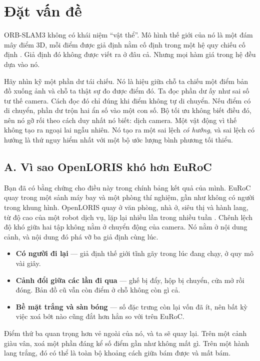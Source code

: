 \documentclass[../../deep_learning.tex]{subfiles}
\begin{document}
\section{Đặt vấn đề}
ORB-SLAM3 không có khái niệm ``vật thể''. Mô hình thế giới của nó là một đám mây điểm 3D, mỗi điểm được giả định nằm cố định trong một hệ quy chiếu cố định \cite{campos2021orbslam3}. Giả định đó không được viết ra ở đâu cả. Nhưng mọi hàm giá trong hệ đều dựa vào nó.

Hãy nhìn kỹ một phần dư tái chiếu. Nó là hiệu giữa chỗ ta chiếu một điểm bản đồ xuống ảnh và chỗ ta thật sự đo được điểm đó. Ta đọc phần dư ấy như sai số tư thế camera. Cách đọc đó chỉ đúng khi điểm không tự di chuyển. Nếu điểm có di chuyển, phần dư trộn hai ẩn số vào một con số. Bộ tối ưu không biết điều đó, nên nó gỡ rối theo cách duy nhất nó biết: dịch camera. Một vật động vì thế không tạo ra ngoại lai ngẫu nhiên. Nó tạo ra một sai lệch \emph{có hướng}, và sai lệch có hướng là thứ nguy hiểm nhất với một bộ ước lượng bình phương tối thiểu.

\subsection{A. Vì sao OpenLORIS khó hơn EuRoC}
Bạn đã có bằng chứng cho điều này trong chính bảng kết quả của mình. EuRoC quay trong một sảnh máy bay và một phòng thí nghiệm, gần như không có người trong khung hình. OpenLORIS quay ở văn phòng, nhà ở, siêu thị và hành lang, từ độ cao của một robot dịch vụ, lặp lại nhiều lần trong nhiều tuần \cite{shi2020openloris}. Chênh lệch độ khó giữa hai tập không nằm ở chuyển động của camera. Nó nằm ở nội dung cảnh, và nội dung đó phá vỡ ba giả định cùng lúc.

\begin{itemize}
\item \textbf{Có người đi lại} --- giả định thế giới tĩnh gãy trong lúc đang chạy, ở quy mô vài giây.
\item \textbf{Cảnh đổi giữa các lần đi qua} --- ghế bị đẩy, hộp bị chuyển, cửa mở rồi đóng. Bản đồ cũ vẫn còn điểm ở chỗ không còn gì cả.
\item \textbf{Bề mặt trắng và sàn bóng} --- số đặc trưng còn lại vốn đã ít, nên bất kỳ việc xoá bớt nào cũng đắt hơn hẳn so với trên EuRoC.
\end{itemize}

Điểm thứ ba quan trọng hơn vẻ ngoài của nó, và ta sẽ quay lại. Trên một cảnh giàu vân, xoá một phần đáng kể số điểm gần như không mất gì. Trên một hành lang trắng, đó có thể là toàn bộ khoảng cách giữa bám được và mất bám.
\end{document}
